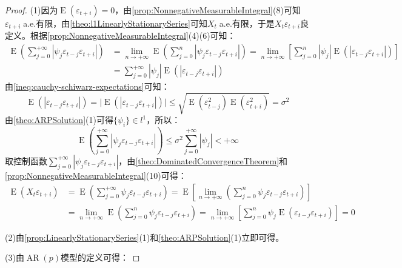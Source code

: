 \begin{proof}
	(1)因为$\operatorname{E}(\varepsilon_{t+i})=0$，由\cref{prop:NonnegativeMeasurableIntegral}(8)可知$\varepsilon_{t+i}\;$a.e.有限，由\cref{theo:l1LinearlyStationarySeries}可知$X_t\;$a.e.有限，于是$X_t\varepsilon_{t+i}$良定义。根据\cref{prop:NonnegativeMeasurableIntegral}(4)(6)可知：
	\begin{align*}
		\operatorname{E}\left(\sum_{j=0}^{+\infty}|\psi_j\varepsilon_{t-j}\varepsilon_{t+i}|\right)
		&=\lim_{n\to+\infty}\operatorname{E}\left(\sum_{j=0}^{n}|\psi_j\varepsilon_{t-j}\varepsilon_{t+i}|\right)
		=\lim_{n\to+\infty}\left[\sum_{j=0}^{n}|\psi_j|\operatorname{E}(|\varepsilon_{t-j}\varepsilon_{t+i}|)\right] \\
		&=\sum_{j=0}^{+\infty}|\psi_j|\operatorname{E}(|\varepsilon_{t-j}\varepsilon_{t+i}|)
	\end{align*}
	由\cref{ineq:cauchy-schiwarz-expectations}可知：
	\begin{equation*}
		\operatorname{E}(|\varepsilon_{t-j}\varepsilon_{t+i}|)=\Big|\operatorname{E}(|\varepsilon_{t-j}\varepsilon_{t+i}|)\Big|\leqslant\sqrt{\operatorname{E}(\varepsilon_{t-j}^2)\operatorname{E}(\varepsilon_{t+i}^2)}=\sigma^2
	\end{equation*}
	由\cref{theo:ARPSolution}(1)可得$\{\psi_i\}\in l^1$，所以：
	\begin{equation*}
		\operatorname{E}\left(\sum_{j=0}^{+\infty}|\psi_j\varepsilon_{t-j}\varepsilon_{t+i}|\right)\leqslant\sigma^2\sum_{j=0}^{+\infty}|\psi_j|<+\infty
	\end{equation*}
	取控制函数$\sum\limits_{j=0}^{+\infty}|\psi_j\varepsilon_{t-j}\varepsilon_{t+i}|$，由\cref{theo:DominatedConvergenceTheorem}和\cref{prop:NonnegativeMeasurableIntegral}(10)可得：
	\begin{align*}
		\operatorname{E}(X_t\varepsilon_{t+i})&=\operatorname{E}\left(\sum_{j=0}^{+\infty}\psi_j\varepsilon_{t-j}\varepsilon_{t+i}\right)=\operatorname{E}\left[\lim_{n\to+\infty}\left(\sum_{j=0}^{n}\psi_j\varepsilon_{t-j}\varepsilon_{t+i}\right)\right] \\
		&=\lim_{n\to+\infty}\operatorname{E}\left(\sum_{j=0}^{n}\psi_j\varepsilon_{t-j}\varepsilon_{t+i}\right)=\lim_{n\to+\infty}\left[\sum_{j=0}^{n}\psi_j\operatorname{E}(\varepsilon_{t-j}\varepsilon_{t+i})\right]=0
	\end{align*}\par
	(2)由\cref{prop:LinearlyStationarySeries}(1)和\cref{theo:ARPSolution}(1)立即可得。\par
	(3)由$\operatorname{AR}(p)$模型的定义可得：

\end{proof}
